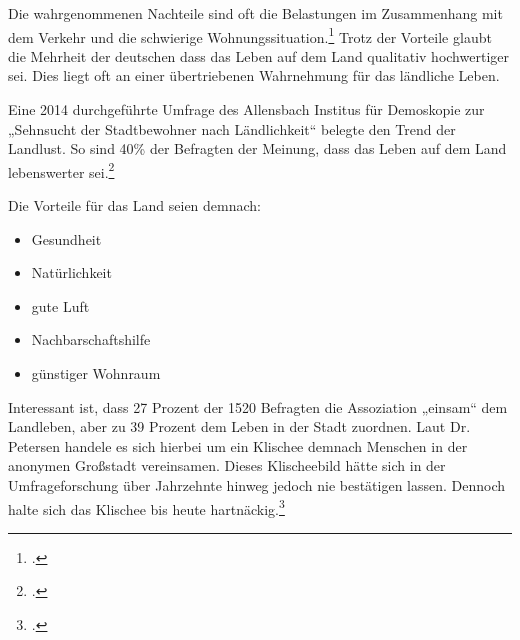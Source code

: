 \documentclass{scrartcl}
\begin{document}
Die wahrgenommenen Nachteile sind oft die Belastungen im Zusammenhang mit dem Verkehr und die schwierige Wohnungssituation.\footcite[S. 41]{Egnolff2015DieIdeal} Trotz der Vorteile glaubt die Mehrheit der deutschen dass das Leben auf dem Land qualitativ hochwertiger sei. Dies liegt oft an einer übertriebenen Wahrnehmung für das ländliche Leben.

Eine 2014 durchgeführte Umfrage des Allensbach Institus für Demoskopie zur „Sehnsucht der Stadtbewohner nach Ländlichkeit“ belegte den Trend der Landlust. So sind 40\% der Befragten der Meinung, dass das Leben auf dem Land lebenswerter sei.\footcite[Vgl.][S. 15 Abb.2]{Dr.ThomasPetersen2014DieLandlichkeit}


Die Vorteile für das Land seien demnach:

\begin{itemize}
    \item Gesundheit
    \item Natürlichkeit
    \item gute Luft
    \item Nachbarschaftshilfe
    \item günstiger Wohnraum
\end{itemize}

Interessant ist, dass 27 Prozent der 1520 Befragten die Assoziation „einsam“ dem Landleben, aber zu 39 Prozent dem Leben in der Stadt zuordnen. Laut Dr. Petersen handele es sich hierbei um ein Klischee demnach Menschen in der anonymen Großstadt vereinsamen. Dieses Klischeebild hätte sich in der Umfrageforschung über Jahrzehnte hinweg jedoch nie bestätigen lassen. Dennoch halte sich das Klischee bis heute hartnäckig.\footcite[Vgl.][S. 7ff]{Dr.ThomasPetersen2014DieLandlichkeit}
\end{document}
